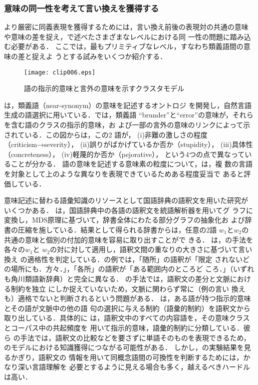 \subsubsection{意味の同一性を考えて言い換えを獲得する}
\label{sssec:distinction}

より厳密に同義表現を獲得するためには，言い換え前後の表現対の共通の意味
や意味の差を捉え，で述べたさまざまなレベルにおける同
一性の問題に踏み込む必要がある．
ここでは，最もプリミティブなレベル，すなわち類義語間の意味の差と捉えよ
うとする試みをいくつか紹介する．

\begin{figure}[t]
\begin{center}
\leavevmode
\texttt{[image: clip006.eps]}
\caption{語の指示的意味と言外の意味を示すクラスタモデル\cite[p.97]{edmonds:99}}
\label{fig:cluster}
\end{center}
\end{figure}

は，類義語（near-synonym）の意味を記述するオントロジ
を開発し，自然言語生成の語選択に用いている．では，類義語
``brunder''と``error''の意味が，それらを含む語のクラスの指示的意味，お
よび一部の言外の意味のリンクによって示されている．この図からは，この2
語が，
(i)非難の激しさの程度（criticism→severity），
(ii)誤りがばかげているか否か（stupidity），
(iii)具体性（concreteness），
(iv)軽蔑的か否か（pejorative），
という4つの点で異なっていることが分かる．
語の意味を記述する意味素の粒度について，\citeauthor{edmonds:99}は，複
数の言語を対象として上のような異なりを表現できているためある程度妥当で
あると評価している．

意味記述に替わる語彙知識のリソースとして国語辞典の語釈文を用いた研究が
いくつかある．
は，国語辞典中の各語の語釈文を統語解析器を用いてグ
ラフに変換し，MDS原理に基づいて，辞書全体にわたる部分グラフの抽象化お
よび辞書の圧縮を施している．結果として得られる辞書からは，任意の2語
$w_{1}$と$w_{2}$の共通の意味と個別の付加的意味を容易に取り出すことがで
きる．
は，\citeauthor{tsuchiya:00}の手法を各々の$w_{1}$と
$w_{2}$の対に対して適用し，語釈文間の重なりの大きさに基づいて言い換え
の適格性を判定している．の例では，「随所」の語釈が「限定
されないどの場所にも．方々．」，「各所」の語釈が「ある範囲内のところど
ころ．」（いずれも角川類語新辞典\cite{kadokawa:81}）と完全に異なる．
\citeauthor{fujita:01}の手法では，語釈文の差分と文脈における制約を独立
にしか捉えていないため，文脈に関わらず常に（例の言い
換えも）適格でないと判断されるという問題がある．
は，ある語が持つ指示的意味とその語が文脈中の他の語
句の選択に与える制約（語彙的制約）を語釈文から取り出している．具体的に
は，語釈文中のすべての内容語を，その意味クラスとコーパス中の共起頻度を
用いて指示的意味，語彙的制約に分類している．彼ら
の手法では，語釈文の比較などを要さずに単語そのものを表現できるため，
のモデルにおける知識獲得につながる可能性がある．
しかし，の実験結果を見るかぎり，語釈文の
情報を用いて同概念語間の可換性を判断するためには，かなり深い言語理解を
必要とするように見える場合も多く，越えるべきハードルは高い．

